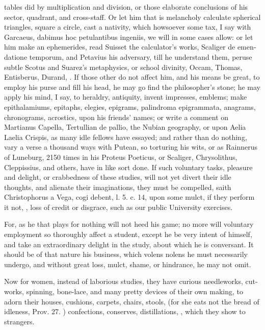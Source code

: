 {tables did by multiplication and division, or those elaborate
conclusions of his sector, quadrant, and cross-staff. Or let him
that is melancholy calculate spherical triangles, square a circle, cast
a nativity, which howsoever some tax, I say with Garcaeus,
dabimus hoc petulantibus ingeniis, we will in some cases allow: or let
him make an ephemerides, read Suisset the calculator's works, Scaliger
\textlatin{de emendatione temporum}, and Petavius his adversary, till he understand
them, peruse subtle Scotus and Suarez's metaphysics, or school
divinity, Occam, Thomas, Entisberus, Durand, \etc{}. If those other do not
affect him, and his means be great, to employ his purse and fill his
head, he may go find the philosopher's stone; he may apply his mind, I
say, to heraldry, antiquity, invent impresses, emblems; make
epithalamiums, epitaphs, elegies, epigrams, palindroma epigrammata,
anagrams, chronograms, acrostics, upon his friends' names; or write a
comment on Martianus Capella, Tertullian de pallio, the Nubian
geography, or upon Aelia Laelia Crispis, as many idle fellows have
essayed; and rather than do nothing, vary a verse a thousand ways
with Putean, so torturing his wits, or as Rainnerus of Luneburg,
2150 times in his Proteus Poeticus, or Scaliger, Chrysolithus,
Cleppissius, and others, have in like sort done. If such voluntary
tasks, pleasure and delight, or crabbedness of these studies, will not
yet divert their idle thoughts, and alienate their imaginations, they
must be compelled, saith Christophorus a Vega, cogi debent, l. 5. c.
14, upon some mulct, if they perform it not, ,
loss of credit or disgrace, such as our public University exercises.

For, as he that plays for nothing will not heed his game; no more will
voluntary employment so thoroughly affect a student, except he be very
intent of himself, and take an extraordinary delight in the study,
about which he is conversant. It should be of that nature his business,
which volens nolens he must necessarily undergo, and without great
loss, mulct, shame, or hindrance, he may not omit.

Now for women, instead of laborious studies, they have curious
needleworks, cut-works, spinning, bone-lace, and many pretty devices of
their own making, to adorn their houses, cushions, carpets, chairs,
stools, (for she eats not the bread of idleness, Prov.  27.
) confections, conserves, distillations, \etc{},
which they show to strangers.

}
